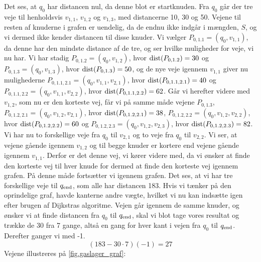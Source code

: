  


Det ses, at $q_0$ har distancen nul, da denne blot er startknuden. Fra $q_0$ går der tre veje til henholdsvis $v_{1,1}$, $v_{1,2}$ og $v_{1,3}$, med distancerne 10, 30 og 50. Vejene til resten af knuderne i grafen er uendelig, da de endnu ikke indgår i mængden, $S$, og vi dermed ikke kender distancen til disse knuder. Vi vælger $P_{0,1.1}=(q_0, v_{1,1})$, da denne har den mindste distance af de tre, og ser hvilke muligheder for veje, vi nu har. Vi har stadig $P_{0,1.2}=(q_{0},v_{1,2})$, hvor $\textrm{dist}(P_{0,1.2})=30$ og $P_{0,1.3}=(q_{0},v_{1,3})$, hvor $\textrm{dist}(P_{0,1.3})=50$, og de nye veje igennem $v_{1,1}$ giver nu mulighederne $P_{0,1.1,2.1}=(q_{0},v_{1,1},v_{2,1})$, hvor $\textrm{dist}(P_{0,1.1,2.1})=40$ og $P_{0,1.1,2.2}=(q_{0},v_{1,1},v_{2,2})$, hvor $\textrm{dist}(P_{0,1.1,2.2})=62$. Går vi herefter videre med $v_{1,2}$, som nu er den korteste vej, får vi på samme måde vejene $P_{0,1.3}$, $P_{0,1.2,2.1}=(q_{0},v_{1,2},v_{2,1})$, hvor $\textrm{dist}(P_{0,1.2,2.1})=38$, $P_{0,1.2,2.2}=(q_{0},v_{1,2},v_{2,2})$, hvor $\textrm{dist}(P_{0,1.2,2.2})=60$ og $P_{0,1.2,2.3}=(q_{0},v_{1,2},v_{2,3})$, hvor $\textrm{dist}(P_{0,1.2,2.3})=82$. Vi har nu to forskellige veje fra $q_{0}$ til $v_{2,1}$ og to veje fra $q_{0}$ til $v_{2,2}$. Vi ser, at vejene gående igennem $v_{1,2}$ og til begge knuder er kortere end vejene gående igennem $v_{1,1}$. Derfor er det denne vej, vi kører videre med, da vi ønsker at finde den korteste vej til hver knude for dermed at finde den korteste vej igennem grafen. På denne måde fortsætter vi igennem grafen. Det ses, at vi har tre forskellige veje til $q_{\textrm{end}}$, som alle har distancen 183. Hvis vi tænker på den oprindelige graf, havde kanterne andre vægte, hvilket vi nu kan indsætte igen efter brugen af Dijkstras algoritme. Vejen går igennem de samme knuder, og ønsker vi at finde distancen fra $q_{0}$ til $q_{\textrm{end}}$, skal vi blot tage vores resultat og trække de 30 fra 7 gange, altså en gang for hver kant i vejen fra $q_{0}$ til $q_{\textrm{end}}$. Derefter ganger vi med -1.
\begin{equation}
(183-30 \cdot 7) (-1) = 27
\end{equation}
Vejene illustreres på \autoref{fig.gaslager_graf}:





